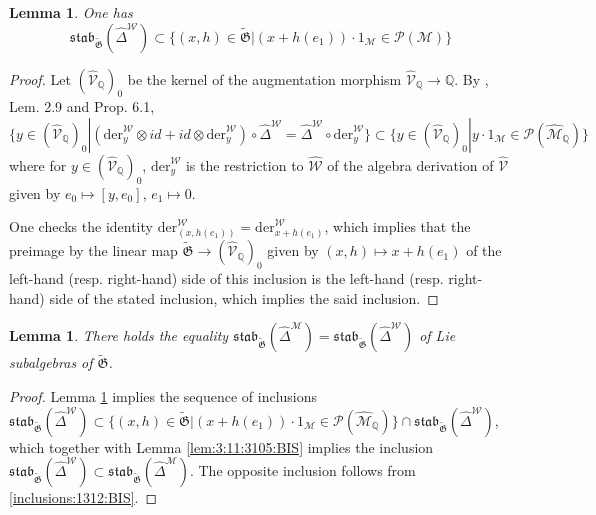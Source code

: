 \documentclass[10pt]{amsart}
\newtheorem{lem}[thm]{Lemma}
\numberwithin{equation}{subsection}
\begin{document}
\begin{lem}\label{lem:3:12:3105:BIS}
One has 
$$
\mathfrak{stab}_{\tilde{\mathfrak G}}(\hat\Delta^{\mathcal W})\subset \{(x,h)\in \tilde{\mathfrak G}|(x+h(e_1))\cdot 1_{\mathcal M}
\in\mathcal P(\mathcal M)\}
$$
\end{lem}

\begin{proof}
Let $(\hat{\mathcal V}_{\mathbb Q})_0$ be the kernel of the augmentation morphism $\hat{\mathcal V}_{\mathbb Q}\to\mathbb Q$. 
By \cite{EF4}, Lem. 2.9 and Prop. 6.1, 
$$
\{y\in(\hat{\mathcal V}_{\mathbb Q})_0|(\mathrm{der}_y^{\mathcal W}\otimes id+id\otimes \mathrm{der}_y^{\mathcal W})\circ
\hat\Delta^{\mathcal W}
=\hat\Delta^{\mathcal W}\circ\mathrm{der}_y^{\mathcal W}\}\subset\{y\in(\hat{\mathcal V}_{\mathbb Q})_0|y\cdot 1_\mathcal M\in\mathcal P(\hat{\mathcal M}_{\mathbb Q})\}
$$
where for $y\in(\hat{\mathcal V}_{\mathbb Q})_0$, $\mathrm{der}_y^{\mathcal W}$ is the restriction to $\hat{\mathcal W}$ 
of the algebra derivation of $\hat{\mathcal V}$ given by $e_0\mapsto[y,e_0]$, $e_1\mapsto0$.   

One checks the identity $\mathrm{der}^{\mathcal W}_{(x,h(e_1))}=\mathrm{der}^{\mathcal W}_{x+h(e_1)}$, which implies that the preimage by 
the linear map $\tilde{\mathfrak G}\to(\hat{\mathcal V}_{\mathbb Q})_0$ given by $(x,h)\mapsto x+h(e_1)$ of the left-hand (resp. right-hand) 
side of this inclusion is the left-hand (resp. right-hand) side of the stated inclusion, which implies the said inclusion. 
\end{proof}


\begin{lem}\label{lem:eq:1329:3105:BIS}
There holds the equality $\mathfrak{stab}_{\tilde{\mathfrak G}}(\hat\Delta^{\mathcal M})
=\mathfrak{stab}_{\tilde{\mathfrak G}}(\hat\Delta^{\mathcal W})$ of Lie subalgebras of $\tilde{\mathfrak G}$. 
\end{lem}

\begin{proof}
Lemma \ref{lem:3:12:3105:BIS} implies the sequence of inclusions
$\mathfrak{stab}_{\tilde{\mathfrak G}}(\hat\Delta^{\mathcal W})\subset \{(x,h)\in \tilde{\mathfrak G}|(x+h(e_1))\cdot 1_{\mathcal M}
\in\mathcal P(\hat{\mathcal M}_{\mathbb Q})\}\cap \mathfrak{stab}_{\tilde{\mathfrak G}}(\hat\Delta^{\mathcal W})$, which together with Lemma
\ref{lem:3:11:3105:BIS} implies the inclusion $\mathfrak{stab}_{\tilde{\mathfrak G}}(\hat\Delta^{\mathcal W})\subset\mathfrak{stab}_{\tilde{\mathfrak G}}
(\hat\Delta^{\mathcal M})$. The opposite inclusion follows from \eqref{inclusions:1312:BIS}. 
\end{proof}
\end{document}
